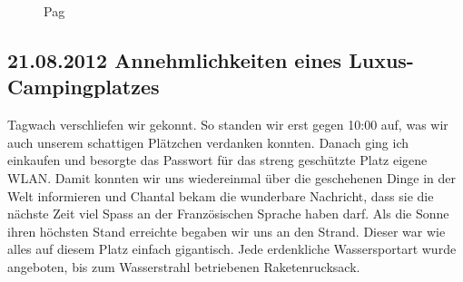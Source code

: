 \begin{figure}[H]
   \centering
   \quad
   \quad
   \quad
   \caption[Pag]{Pag}
\end{figure}

\subsection{21.08.2012 Annehmlichkeiten eines Luxus-Campingplatzes}
Tagwach verschliefen wir gekonnt.
So standen wir erst gegen 10:00 auf, was wir auch unserem schattigen Plätzchen verdanken konnten.
Danach ging ich einkaufen und besorgte das Passwort für das streng geschützte Platz eigene WLAN.
Damit konnten wir uns wiedereinmal über die geschehenen Dinge in der Welt informieren und Chantal bekam die wunderbare Nachricht, dass sie die nächste Zeit viel Spass an der Französischen Sprache haben darf.
Als die Sonne ihren höchsten Stand erreichte begaben wir uns an den Strand.
Dieser war wie alles auf diesem Platz einfach gigantisch.
Jede erdenkliche Wassersportart wurde angeboten, bis zum Wasserstrahl betriebenen Raketenrucksack.

